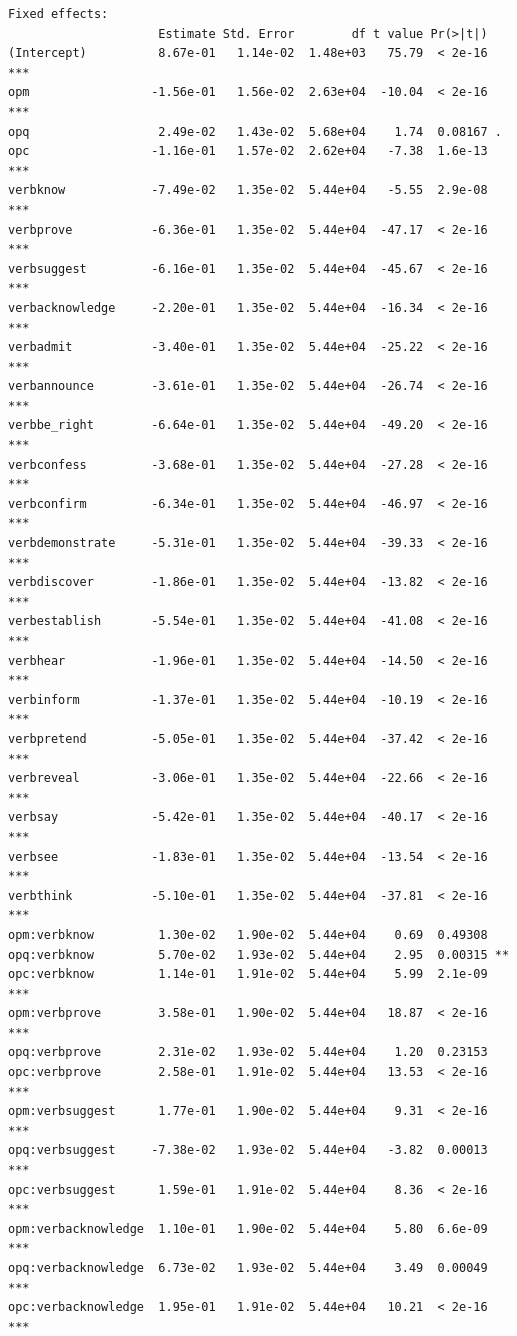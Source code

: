 \documentclass[10pt]{article}\usepackage[]{graphicx}\usepackage[dvipsnames]{xcolor}
\makeatletter
\newenvironment{kframe}{%
 \def\at@end@of@kframe{}%
 \ifinner\ifhmode%
  \def\at@end@of@kframe{\end{minipage}}%
  \begin{minipage}{\columnwidth}%
 \fi\fi%
 \def\FrameCommand##1{\hskip\@totalleftmargin \hskip-\fboxsep
 \colorbox{shadecolor}{##1}\hskip-\fboxsep
     \hskip-\linewidth \hskip-\@totalleftmargin \hskip\columnwidth}%
 \MakeFramed {\advance\hsize-\width
   \@totalleftmargin\z@ \linewidth\hsize
   \@setminipage}}%
 {\par\unskip\endMakeFramed%
 \at@end@of@kframe}
\newenvironment{knitrout}{}{} %
\makeatother
\begin{document}
\begin{knitrout}
\begin{kframe}
\begin{verbatim}
Fixed effects:
                     Estimate Std. Error        df t value Pr(>|t|)    
(Intercept)          8.67e-01   1.14e-02  1.48e+03   75.79  < 2e-16 ***
opm                 -1.56e-01   1.56e-02  2.63e+04  -10.04  < 2e-16 ***
opq                  2.49e-02   1.43e-02  5.68e+04    1.74  0.08167 .  
opc                 -1.16e-01   1.57e-02  2.62e+04   -7.38  1.6e-13 ***
verbknow            -7.49e-02   1.35e-02  5.44e+04   -5.55  2.9e-08 ***
verbprove           -6.36e-01   1.35e-02  5.44e+04  -47.17  < 2e-16 ***
verbsuggest         -6.16e-01   1.35e-02  5.44e+04  -45.67  < 2e-16 ***
verbacknowledge     -2.20e-01   1.35e-02  5.44e+04  -16.34  < 2e-16 ***
verbadmit           -3.40e-01   1.35e-02  5.44e+04  -25.22  < 2e-16 ***
verbannounce        -3.61e-01   1.35e-02  5.44e+04  -26.74  < 2e-16 ***
verbbe_right        -6.64e-01   1.35e-02  5.44e+04  -49.20  < 2e-16 ***
verbconfess         -3.68e-01   1.35e-02  5.44e+04  -27.28  < 2e-16 ***
verbconfirm         -6.34e-01   1.35e-02  5.44e+04  -46.97  < 2e-16 ***
verbdemonstrate     -5.31e-01   1.35e-02  5.44e+04  -39.33  < 2e-16 ***
verbdiscover        -1.86e-01   1.35e-02  5.44e+04  -13.82  < 2e-16 ***
verbestablish       -5.54e-01   1.35e-02  5.44e+04  -41.08  < 2e-16 ***
verbhear            -1.96e-01   1.35e-02  5.44e+04  -14.50  < 2e-16 ***
verbinform          -1.37e-01   1.35e-02  5.44e+04  -10.19  < 2e-16 ***
verbpretend         -5.05e-01   1.35e-02  5.44e+04  -37.42  < 2e-16 ***
verbreveal          -3.06e-01   1.35e-02  5.44e+04  -22.66  < 2e-16 ***
verbsay             -5.42e-01   1.35e-02  5.44e+04  -40.17  < 2e-16 ***
verbsee             -1.83e-01   1.35e-02  5.44e+04  -13.54  < 2e-16 ***
verbthink           -5.10e-01   1.35e-02  5.44e+04  -37.81  < 2e-16 ***
opm:verbknow         1.30e-02   1.90e-02  5.44e+04    0.69  0.49308    
opq:verbknow         5.70e-02   1.93e-02  5.44e+04    2.95  0.00315 ** 
opc:verbknow         1.14e-01   1.91e-02  5.44e+04    5.99  2.1e-09 ***
opm:verbprove        3.58e-01   1.90e-02  5.44e+04   18.87  < 2e-16 ***
opq:verbprove        2.31e-02   1.93e-02  5.44e+04    1.20  0.23153    
opc:verbprove        2.58e-01   1.91e-02  5.44e+04   13.53  < 2e-16 ***
opm:verbsuggest      1.77e-01   1.90e-02  5.44e+04    9.31  < 2e-16 ***
opq:verbsuggest     -7.38e-02   1.93e-02  5.44e+04   -3.82  0.00013 ***
opc:verbsuggest      1.59e-01   1.91e-02  5.44e+04    8.36  < 2e-16 ***
opm:verbacknowledge  1.10e-01   1.90e-02  5.44e+04    5.80  6.6e-09 ***
opq:verbacknowledge  6.73e-02   1.93e-02  5.44e+04    3.49  0.00049 ***
opc:verbacknowledge  1.95e-01   1.91e-02  5.44e+04   10.21  < 2e-16 ***

\end{verbatim}
\end{kframe}
\end{knitrout}
\end{document}
